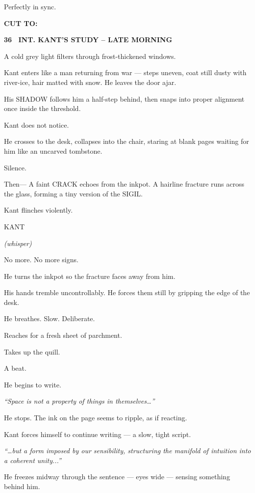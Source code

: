\documentclass[12pt]{article}
\newcommand{\scene}[2]{%
  \vspace{1.8\baselineskip}%
  \noindent\textbf{#1 \ #2}\par\vspace{0.4\baselineskip}%
}
\newenvironment{dialogue}[1]{%
  \vspace{0.8\baselineskip}%
  \noindent\hspace*{2.3in}\textsc{#1}\par%
  \noindent\hspace*{1.5in}\begin{minipage}[t]{4.5in}%
}{%
  \end{minipage}\par%
}
\newcommand{\paren}[1]{%
  \noindent\hspace*{1.8in}\textit{(#1)}\par%
}
\newcommand{\transition}[1]{%
  \vspace{0.6\baselineskip}%
  \begin{flushright}\textbf{#1}\end{flushright}%
}
\begin{document}
Perfectly in sync.

\transition{CUT TO:}


\scene{36}{INT. KANT'S STUDY -- LATE MORNING}

A cold grey light filters through frost-thickened windows.

Kant enters like a man returning from war — steps uneven, coat still
dusty with river-ice, hair matted with snow. He leaves the door ajar.

His SHADOW follows him a half-step behind, then snaps into proper
alignment once inside the threshold.

Kant does not notice.

He crosses to the desk, collapses into the chair, staring at blank
pages waiting for him like an uncarved tombstone.

Silence.

Then—  
A faint CRACK echoes from the inkpot. A hairline fracture runs across
the glass, forming a tiny version of the SIGIL.

Kant flinches violently.

\begin{dialogue}{KANT}
\paren{whisper}
No more.  
No more signs.
\end{dialogue}

He turns the inkpot so the fracture faces away from him.

His hands tremble uncontrollably. He forces them still by gripping the
edge of the desk.

He breathes. Slow. Deliberate.

Reaches for a fresh sheet of parchment.

Takes up the quill.

A beat.

He begins to write.

\textit{“Space is not a property of things in themselves…”}

He stops. The ink on the page seems to ripple, as if reacting.

Kant forces himself to continue writing — a slow, tight script.

\textit{“…but a form imposed by our sensibility, structuring the
manifold of intuition into a coherent unity...”}

He freezes midway through the sentence — eyes wide — sensing something
behind him.
\end{document}
